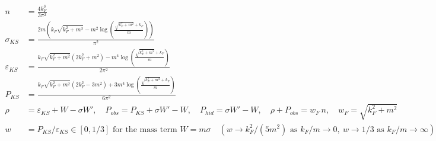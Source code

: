 \begin{align*}
n &= \frac{4 k_{F}^3}{3 \pi ^2} \\
\sigma_{KS} &= \frac{2 m \left(k_{F} \sqrt{k_{F}^2+m^2}-m^2 \log \left(\frac{\sqrt{k_{F}^2+m^2}+k_{F}}{m}\right)\right)}{\pi ^2} \\
\varepsilon_{KS} &= \frac{k_{F} \sqrt{k_{F}^2+m^2} \left(2 k_{F}^2+m^2\right)-m^4 \log \left(\frac{\sqrt{k_{F}^2+m^2}+k_{F}}{m}\right)}{2 \pi ^2} \\
P_{KS} &= \frac{k_{F} \sqrt{k_{F}^2+m^2} \left(2 k_{F}^2-3 m^2\right)+3 m^4 \log \left(\frac{\sqrt{k_{F}^2+m^2}+k_{F}}{m}\right)}{6 \pi ^2} \\
\rho &= \varepsilon_{KS} + W - \sigma W', \quad P_{obs} = P_{KS} + \sigma W' - W, \quad P_{hid} = \sigma W' - W, \quad \rho + P_{obs} = w_F\, n, \quad w_F = \sqrt{k_F^2+m^2} \\
w &= P_{KS}/\varepsilon_{KS} \in [0, 1/3] \text{ for the mass term } W = m\sigma \quad (w \to k_F^2/(5m^2) \text{ as } k_F/m\to 0,\ w\to 1/3 \text{ as } k_F/m\to\infty)
\end{align*}
